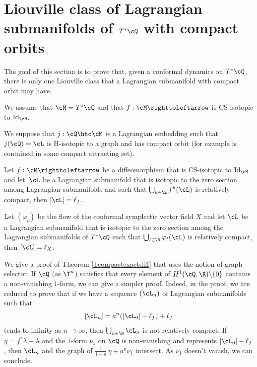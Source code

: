 \section{Liouville class of Lagrangian submanifolds of \texorpdfstring{$T^*\cQ$}{T*Q} with compact orbits}

The goal of this section is to prove that, given a conformal dynamics on $T^*\cQ$, there is only one Liouville class that a Lagrangian submanifold with compact orbit may have.

We assume that $\cM=T^*\cQ$ and that $f: \cM \righttoleftarrow$ is CS-isotopic to ${\rm Id}_\cM$.

We suppose that $j:\cQ\hto\cM$ is a Lagrangian embedding such that $j(\cQ)=\cL$ is H\nobreakdash-isotopic to a graph and has compact orbit (for example is contained in some compact attracting set).

\begin{theorem}\label{Tcompactexactdiff}
Let $f: \cM \righttoleftarrow$ be a diffeomorphism that is CS-isotopic to ${\rm Id}_\cM$ and let~$\cL$ be a Lagrangian submanifold that is isotopic to the zero section among Lagrangian submanifolds and such that $\bigcup_{k\in\Z}f^k(\cL)$ is relatively compact, then $[\cL]=\ell_f$.
\end{theorem}

\begin{corollary}
Let $(\varphi_t)$ be the flow of the conformal symplectic vector field $X$ and let $\cL$ be a { Lagrangian submanifold that is isotopic to the zero section among the Lagrangian submanifolds} of $T^*\cQ$ such that $\bigcup_{t\in\R}\varphi_t(\cL)$ is relatively compact, then $[\cL]=\ell_X$.
\end{corollary}

\begin{remark}
We give a proof of Theorem \ref{Tcompactexactdiff} that uses the notion of graph selector. If $\cQ$ (as $\T^n$) satisfies that every element of $H^1(\cQ, \R)\backslash\{ 0\}$ contains a non-vanishing $1$\nobreakdash-form, we can give a simpler proof. Indeed, in the proof, we are reduced to prove that if we have a sequence $(\cL_n)$ of Lagrangian submanifolds such that
\[
[ \cL_n]=a^n([\cL_0]-\ell_f)+\ell_f
\]
tends to infinity as $n \to \infty$, then $\bigcup_{n\in\N}\cL_n$ is not relatively compact. If $\eta=f^*\lambda-\lambda$ and the $1$-form $\nu_1$ on $\cQ$ is non-vanishing and represents $[\cL_0]-\ell_f$, then $\cL_n$ and the graph of $\frac{1}{1-a}\,\eta+a^n\nu_1$ intersect. As $\nu_1$ doesn't vanish, we can conclude.
\end{remark}

